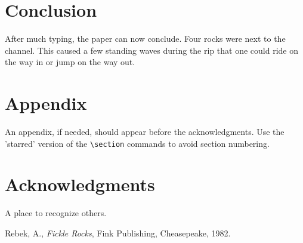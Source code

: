\documentclass[]{aiaa-tc} %
\begin{document}
\section{Conclusion}

After much typing, the paper can now conclude.
Four rocks were next to the channel.
This caused a few standing waves during the rip that one could ride on
the way in or jump on the way out.

\section*{Appendix}

An appendix, if needed, should appear before the acknowledgments.
Use the 'starred' version of the \verb|\section| commands to avoid
section numbering.

\section*{Acknowledgments}

A place to recognize others.

\begin{thebibliography}{9}%
 Rebek, A., {\it Fickle Rocks}, Fink Publishing, Cheasepeake, 1982.
\end{thebibliography}
\end{document}
